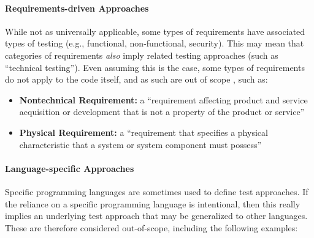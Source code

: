 \paragraph{Requirements-driven Approaches}\label{req-test}
While not as universally applicable, some types of requirements have associated
types of testing (e.g., functional, non-functional, security). This may mean
that categories of requirements \emph{also} imply related testing approaches
(such as ``technical testing''). \ifnotpaper Even assuming this is the case, some types of
    requirements do not apply to the code itself, and as such are out of scope%
    , such as:
    \begin{itemize}
        \item \textbf{Nontechnical Requirement:} a ``requirement affecting product
              and service acquisition or development that is not a property of
              the product or service'' \citep[p.~293]{IEEE2017}
        \item \textbf{Physical Requirement:} a ``requirement that specifies a
              physical characteristic that a system or system component must
              possess'' \citep[p.~322]{IEEE2017}
    \end{itemize}
\fi

\paragraph{Language-specific Approaches}\label{lang-test}
Specific programming languages are sometimes used to define test approaches.
If the reliance on a specific programming language is intentional, then
this really implies an underlying test approach that may be generalized to
other languages. These are therefore considered out-of-scope,
including the following examples:

